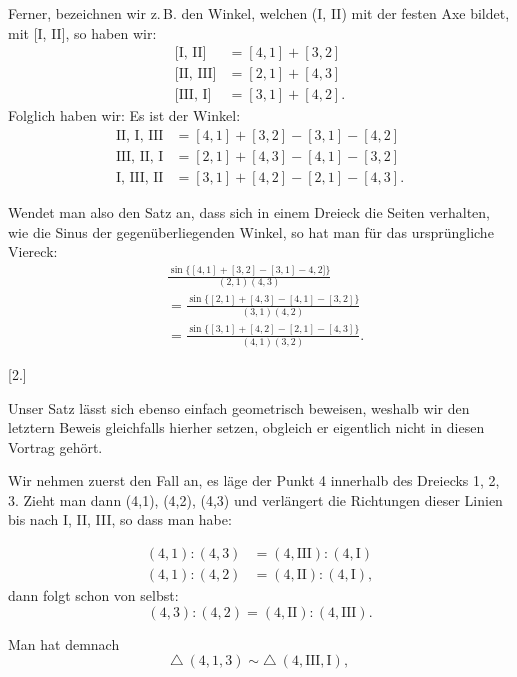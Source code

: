 
Ferner, bezeichnen wir z.\,B. den Winkel, welchen (I, II) mit der festen Axe bildet, mit [I, II],
so haben wir:
\[
\begin{array}{rl}
\text{[I, II]} & = [4,1] + [3,2] \\
\text{[II, III]} & = [2,1] + [4,3] \\
\text{[III, I]} & = [3,1] + [4,2].
\end{array}
\]
Folglich haben wir: Es ist der Winkel:
\[
\begin{array}{rl}
\text{II, I, III} & = [4,1] + [3,2] - [3,1] - [4,2] \\
\text{III, II, I} & = [2,1] + [4,3] - [4,1] - [3,2] \\
\text{I, III, II} & = [3,1] + [4,2] - [2,1] - [4,3].
\end{array}
\]

Wendet man also den Satz an, dass sich in einem Dreieck die Seiten verhalten, wie die Sinus der
gegenüberliegenden Winkel, so hat man für das ursprüngliche Viereck:
\[
\begin{aligned}
&\frac{\sin\{[4,1]+[3,2]-[3,1]-4,2]\}}{(2,1)(4,3)}\\
&=\frac{\sin\{[2,1]+[4,3]-[4,1]-[3,2]\}}{(3,1)(4,2)}\\
&=\frac{\sin\{[3,1]+[4,2]-[2,1]-[4,3]\}}{(4,1)(3,2)}.
\end{aligned}
\]

\begin{center}
[2.]
\end{center}

Unser Satz lässt sich ebenso einfach geometrisch beweisen, weshalb wir den letztern Beweis
gleichfalls hierher setzen, obgleich er eigentlich nicht in diesen Vortrag gehört.

Wir nehmen zuerst den Fall an, es läge der Punkt 4 innerhalb des Dreiecks 1, 2, 3. Zieht man dann
(4,1), (4,2), (4,3) und verlängert die Richtungen dieser Linien bis nach I, II, III, so dass man
habe:

\begin{center}\end{center}

\[
\begin{array}{rl}
(4,1) : (4,3) & = (4,\text{III}) : (4,\text{I}) \\
(4,1) : (4,2) & = (4,\text{II}) : (4,\text{I}),
\end{array}
\]
dann folgt schon von selbst:
\[
(4,3) : (4,2) = (4,\text{II}) : (4,\text{III}).
\]

Man hat demnach
\[
\triangle\ (4,1,3) \sim \triangle\ (4,\text{III},\text{I}),
\]

